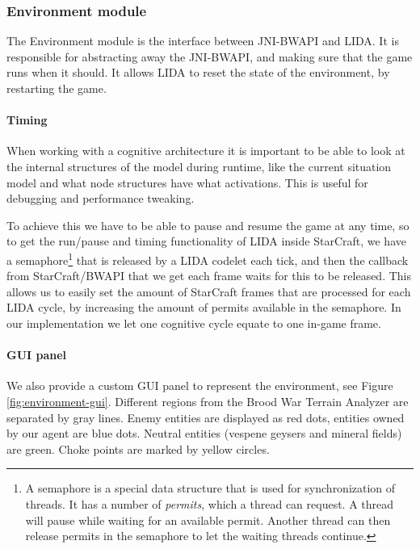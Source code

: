 \subsubsection{Environment module}
The Environment module is the interface between JNI-BWAPI and LIDA. It is responsible for abstracting away the JNI-BWAPI, and making sure that the game runs when it should. It allows LIDA to reset the state of the environment, by restarting the game.

\paragraph{Timing} When working with a cognitive architecture it is important to be able to look at the internal structures of the model during runtime, like the current situation model and what node structures have what activations. This is useful for debugging and performance tweaking.

To achieve this we have to be able to pause and resume the game at any time, so to get the run/pause and timing functionality of LIDA inside StarCraft, we have a semaphore\footnote{A semaphore is a special data structure that is used for synchronization of threads. It has a number of {\em permits}, which a thread can request. A thread will pause while waiting for an available permit. Another thread can then release permits in the semaphore to let the waiting threads continue.} that is released by a LIDA codelet each tick, and then the callback from StarCraft/BWAPI that we get each frame waits for this to be released. This allows us to easily set the amount of StarCraft frames that are processed for each LIDA cycle, by increasing the amount of permits available in the semaphore. In our implementation we let one cognitive cycle equate to one in-game frame.

\paragraph{GUI panel} We also provide a custom GUI panel to represent the environment, see Figure \ref{fig:environment-gui}. Different regions from the Brood War Terrain Analyzer are separated by gray lines. Enemy entities are displayed as red dots, entities owned by our agent are blue dots. Neutral entities (vespene geysers and mineral fields) are green. Choke points are marked by yellow circles.

